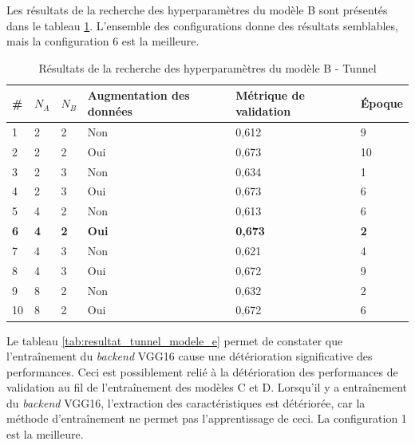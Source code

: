     Les résultats de la recherche des hyperparamètres du modèle B sont présentés dans le tableau \ref{tab:resultat_tunnel_modele_b}. L'ensemble des configurations donne des résultats semblables, mais la configuration 6 est la meilleure.\\

    \begin{table}
        \centering
        \caption{Résultats de la recherche des hyperparamètres du modèle B - Tunnel}
        \label{tab:resultat_tunnel_modele_b}
        \begin{tabular}{lllp{3cm}p{3cm}l}
            \midrule
            \# & \(N_A\) & \(N_B\) & Augmentation des données & Métrique de validation & Époque\\
            \midrule\midrule
            1  & 2 & 2 & Non & 0,612 & 9\\
            2  & 2 & 2 & Oui & 0,673 & 10\\
            3  & 2 & 3 & Non & 0,634 & 1\\
            4  & 2 & 3 & Oui & 0,673 & 6\\
            5  & 4 & 2 & Non & 0,613 & 6\\
            \textbf{6}  & \textbf{4} & \textbf{2} & \textbf{Oui} & \textbf{0,673} & \textbf{2}\\
            7  & 4 & 3 & Non & 0,621 & 4\\
            8  & 4 & 3 & Oui & 0,672 & 9\\
            9  & 8 & 2 & Non & 0,632 & 2\\
            10 & 8 & 2 & Oui & 0,672 & 6\\
            \midrule
        \end{tabular}
    \end{table}

    Le tableau \ref{tab:resultat_tunnel_modele_e} permet de constater que l'entraînement du \textit{backend} VGG16 cause une détérioration significative des performances. Ceci est possiblement relié à la détérioration des performances de validation au fil de l'entraînement des modèles C et D. Lorsqu'il y a entraînement du \textit{backend} VGG16, l'extraction des caractéristiques est détériorée, car la méthode d'entraînement ne permet pas l'apprentissage de ceci. La configuration 1 est la meilleure.\\

